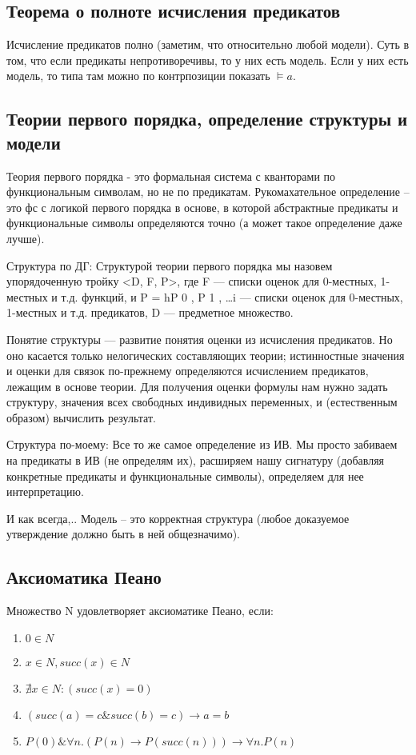 \documentclass[12pt]{article}
\begin{document}
\subsection{Теорема о полноте исчисления предикатов}
\label{sec-2-17}
Исчисление предикатов полно (заметим, что относительно любой модели).
Суть в том, что если предикаты непротиворечивы, то у них есть модель.
Если у них есть модель, то типа там можно по контрпозиции показать $\models a$.
\subsection{Теории первого порядка, определение структуры и модели}
\label{sec-2-18}
Теория первого порядка - это формальная система с кванторами по
функциональным символам, но не по предикатам. Рукомахательное
определение – это фс с логикой первого порядка в основе, в которой
абстрактные предикаты и функциональные символы определяются точно
(а может такое определение даже лучше).

Структура по ДГ:
Структурой теории первого порядка мы назовем упорядоченную тройку
<D, F, P>, где F — списки оценок для 0-местных, 1-местных и т.д.
функций, и P = hP 0 , P 1 , \ldots{}i — списки оценок для 0-местных,
1-местных и т.д. предикатов, D — предметное множество.

Понятие структуры — развитие понятия оценки из исчисления предикатов.
Но оно касается только нелогических составляющих теории; истинностные
значения и оценки для связок по-прежнему определяются исчислением
предикатов, лежащим в основе теории. Для получения оценки формулы
нам нужно задать структуру, значения всех свободных индивидных
переменных, и (естественным образом) вычислить результат.

Структура по-моему:
Все то же самое определение из ИВ. Мы просто забиваем на предикаты
в ИВ (не определям их), расширяем нашу сигнатуру (добавляя конкретные
предикаты и функциональные символы), определяем для нее интерпретацию.

И как всегда,..
Модель – это корректная структура (любое доказуемое утверждение должно
быть в ней общезначимо).
\subsection{Аксиоматика Пеано}
\label{sec-2-19}
Множество N удовлетворяет аксиоматике Пеано, если:
\begin{enumerate}
\item $0 \in N$
\item $x \in N, succ(x) \in N$
\item $∄ x \in N : (succ(x) = 0)$
\item $(succ(a) = c \& succ(b) = c) \to a = b$
\item $P(0) \& ∀n.(P(n) \to P(succ(n))) \to ∀n.P(n)$
\end{enumerate}
\end{document}
